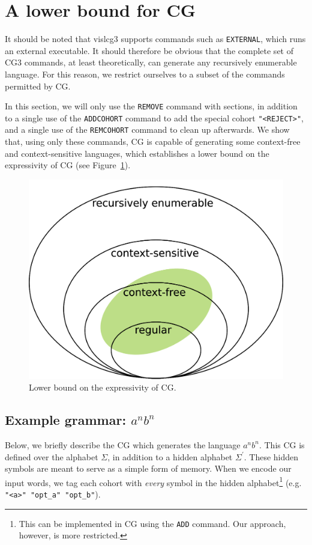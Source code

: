 \documentclass[11pt]{article}
\def\t#1{\texttt{#1}}
\begin{document}
\section{A lower bound for CG}

It should be noted that vislcg3 supports commands such as \t{EXTERNAL}, which
runs an external executable. It should therefore be obvious that the complete
set of CG3 commands, at least theoretically, can generate any recursively
enumerable language. For this reason, we restrict ourselves to a subset of the
commands permitted by CG.

In this section, we will only use the \t{REMOVE} command with sections, in
addition to a single use of the \t{ADDCOHORT} command to add the special cohort
\t{"<REJECT>"}, and a single use of the \t{REMCOHORT} command to clean up
afterwards. 
We show that, using only these commands, CG is capable of generating some
context-free and context-sensitive languages, which establishes a lower bound on 
the expressivity of CG (see Figure~\ref{fig:nocorr}).

\begin{figure}[h]
  \centering
  \includegraphics[width=0.8\linewidth]{chomsky}
  \caption{Lower bound on the expressivity of CG.}
  \label{fig:nocorr}
\end{figure}

\subsection{Example grammar: $a^nb^n$ }

Below, we briefly describe the CG which generates the language $a^nb^n$.
This CG is defined over the alphabet $\Sigma$, in addition to a hidden alphabet
$\Sigma^\prime$. These hidden symbols are meant to serve as a simple form of
memory. When we encode our input words, we tag each cohort with \emph{every}
symbol in the hidden alphabet\footnote{
  This can be implemented in CG using the \t{ADD} command.
  Our approach, however, is more restricted. 
} (e.g. \t{"<a>" "opt\_a" "opt\_b"}).
\end{document}

